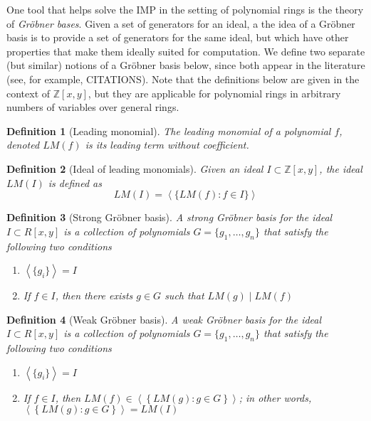\documentclass[11pt]{report}
\newtheorem{definition}{Definition}
\newcommand{\Zxy}{\mathbb{Z}[x,y]}
\begin{document}
One tool that helps solve the IMP in the setting of polynomial rings is the theory of \emph{Gr\"obner bases}. Given a set of generators for an ideal, a the idea of a Gr\"obner basis is to provide a set of generators for the same ideal, but which have other properties that make them ideally suited for computation. We define two separate (but similar) notions of a Gr\"obner basis below, since both appear in the literature (see, for example, CITATIONS). Note that the definitions below are given in the context of $\Zxy$, but they are applicable for polynomial rings in arbitrary numbers of variables over general rings.

\begin{definition}[Leading monomial]
The \emph{leading monomial} of a polynomial $f$, denoted $LM(f)$ is its leading term without coefficient.
\end{definition}

\begin{definition}[Ideal of leading monomials]
Given an ideal $I\subset \Zxy$, the ideal $LM(I)$ is defined as
\[LM(I) = \left\langle\{LM(f) : f\in I\}\right\rangle \]
\end{definition}

\begin{definition}[Strong Gr\"obner basis]
A \emph{strong Gr\"obner basis} for the ideal $I\subset R[x,y]$ is a collection of polynomials $G=\{g_1,\dots,g_n\}$ that satisfy the following two conditions
\begin{enumerate}
\item $\left\langle\{g_i\}\right\rangle = I$
\item If $f\in I$, then there exists $g\in G$ such that $LM(g) \mid LM(f)$
\end{enumerate}
\end{definition}

\begin{definition}[Weak Gr\"obner basis]
A \emph{weak Gr\"obner basis} for the ideal $I\subset R[x,y]$ is a collection of polynomials $G=\{g_1,\dots,g_n\}$ that satisfy the following two conditions
\begin{enumerate}
\item $\left\langle\{g_i\}\right\rangle = I$
\item If $f\in I$, then $LM(f) \in \left\langle \left\{ LM(g) : g\in G\right\} \right\rangle$; in other words, $\left\langle \left\{ LM(g) : g\in G\right\} \right\rangle = LM(I)$
\end{enumerate}
\end{definition}
\end{document}
